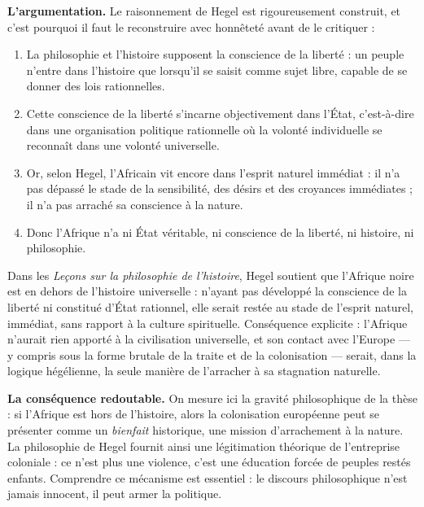 \documentclass[11pt]{article}
\newcommand{\cle}[1]{{\popxbold\color{popdark}#1}}
\begin{document}
\textbf{L'argumentation.} Le raisonnement de Hegel est rigoureusement construit, et c'est pourquoi il faut le reconstruire avec honnêteté avant de le critiquer :

\begin{enumerate}
\item La philosophie et l'histoire supposent la \cle{conscience de la liberté} : un peuple n'entre dans l'histoire que lorsqu'il se saisit comme sujet libre, capable de se donner des lois rationnelles.
\item Cette conscience de la liberté s'incarne objectivement dans l'\cle{État}, c'est-à-dire dans une organisation politique rationnelle où la volonté individuelle se reconnaît dans une volonté universelle.
\item Or, selon Hegel, l'Africain vit encore dans l'\cle{esprit naturel immédiat} : il n'a pas dépassé le stade de la sensibilité, des désirs et des croyances immédiates ; il n'a pas arraché sa conscience à la nature.
\item Donc l'Afrique n'a ni État véritable, ni conscience de la liberté, ni histoire, ni philosophie.
\end{enumerate}

\begin{propriete}
Dans les \emph{Leçons sur la philosophie de l'histoire}, Hegel soutient que l'Afrique noire est en dehors de l'histoire universelle : n'ayant pas développé la conscience de la liberté ni constitué d'État rationnel, elle serait restée au stade de l'esprit naturel, immédiat, sans rapport à la culture spirituelle. Conséquence explicite : l'Afrique n'aurait rien apporté à la civilisation universelle, et son contact avec l'Europe — y compris sous la forme brutale de la traite et de la colonisation — serait, dans la logique hégélienne, la seule manière de l'arracher à sa stagnation naturelle.
\end{propriete}

\textbf{La conséquence redoutable.} On mesure ici la gravité philosophique de la thèse : si l'Afrique est hors de l'histoire, alors la colonisation européenne peut se présenter comme un \emph{bienfait} historique, une mission d'arrachement à la nature. La philosophie de Hegel fournit ainsi une légitimation théorique de l'entreprise coloniale : ce n'est plus une violence, c'est une \guillemotleft éducation \guillemotright forcée de peuples restés enfants. Comprendre ce mécanisme est essentiel : le discours philosophique n'est jamais innocent, il peut armer la politique.
\end{document}
